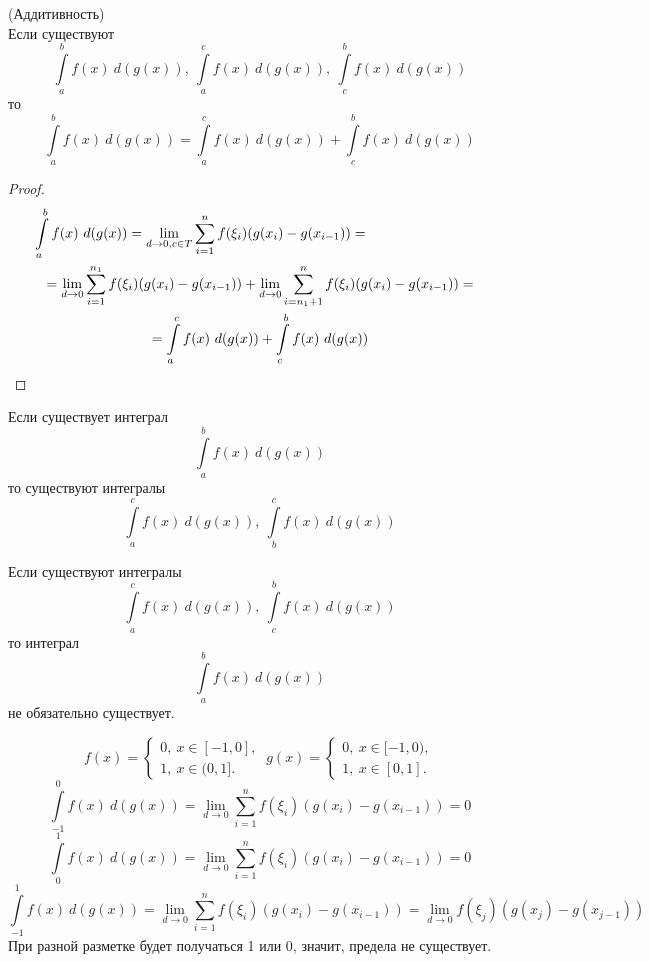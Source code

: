 \begin{numtheorem}
    (Аддитивность)\\
    Если существуют 
    \[\int\limits_{a}^{b}f(x)\ d(g(x)),\ \int\limits_{a}^{c}f(x)\ d(g(x)),\ \int\limits_{c}^{b}f(x)\ d(g(x))\]
    то 
    \[\int\limits_{a}^{b}f(x)\ d(g(x))=\int\limits_{a}^{c}f(x)\ d(g(x)) + \int\limits_{c}^{b}f(x)\ d(g(x))\]
\end{numtheorem} 
\begin{proof}
\begin{multline*}
    \int\limits_{a}^{b}f(x)\ d(g(x))=\lim\limits_{d\to 0, c\in T}\sum\limits_{i=1}^{n}f(\xi_i)(g(x_i)-g(x_{i-1}))=\tab[3cm]\\
    =\lim\limits_{d\to 0}\sum\limits_{i=1}^{n_1}f(\xi_i)(g(x_i)-g(x_{i-1}))+\lim\limits_{d\to 0}\sum\limits_{i=n_1+1}^{n}f(\xi_i)(g(x_i)-g(x_{i-1}))=\\=\int\limits_{a}^{c}f(x)\ d(g(x)) + \int\limits_{c}^{b}f(x)\ d(g(x))
\end{multline*}
\end{proof} 
\begin{comm}
    Если существует интеграл
    \[\int\limits_{a}^{b}f(x)\ d(g(x))\]
    то существуют интегралы
    \[\int\limits_{a}^{c}f(x)\ d(g(x)),\ \int\limits_{b}^{c}f(x)\ d(g(x))\]
\end{comm} 
\begin{comm}
    Если существуют интегралы
    \[\int\limits_{a}^{c}f(x)\ d(g(x)),\ \int\limits_{c}^{b}f(x)\ d(g(x))\]
    то интеграл
    \[\int\limits_{a}^{b}f(x)\ d(g(x))\]
    не обязательно существует.
\end{comm} 
\begin{example}
    \[f(x)=\begin{cases}
        0,\ x\in [-1,0],\\
        1,\ x\in (0, 1].
    \end{cases}\
        g(x)=\begin{cases}
            0,\ x\in [-1,0),\\
            1,\ x\in [0, 1].
    \end{cases}
    \]
    \[\int\limits_{-1}^{0}f(x)\ d(g(x))=\lim\limits_{d\to 0}\sum\limits_{i=1}^{n}f(\xi_i)(g(x_{i})-g(x_{i-1}))=0\]
    \[\int\limits_{0}^{1}f(x)\ d(g(x))=\lim\limits_{d\to 0}\sum\limits_{i=1}^{n}f(\xi_i)(g(x_{i})-g(x_{i-1}))=0\]
    \[\int\limits_{-1}^{1}f(x)\ d(g(x))=\lim\limits_{d\to 0}\sum\limits_{i=1}^{n}f(\xi_i)(g(x_{i})-g(x_{i-1}))=\lim\limits_{d\to 0} f(\xi_j)(g(x_j)-g(x_{j-1}))\]
    При разной разметке будет получаться 1 или 0, значит, предела не существует.
\end{example}
